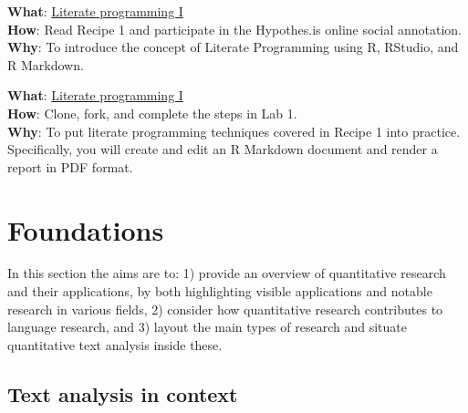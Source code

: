 \documentclass[
  letterpaper,
]{latex/krantz}
\begin{document}
\begin{tcolorbox}[enhanced jigsaw, opacitybacktitle=0.6, breakable, colframe=quarto-callout-note-color-frame, arc=.35mm, left=2mm, leftrule=.75mm, title=\textcolor{quarto-callout-note-color}{\faInfo}\hspace{0.5em}{Recipe}, opacityback=0, colback=white, toptitle=1mm, rightrule=.15mm, titlerule=0mm, bottomtitle=1mm, bottomrule=.15mm, coltitle=black, colbacktitle=quarto-callout-note-color!10!white, toprule=.15mm]
\textbf{What}:
\href{https://lin380.github.io/tadr/articles/recipe_1.html}{Literate
programming I}\\
\textbf{How}: Read Recipe 1 and participate in the Hypothes.is online
social annotation.\\
\textbf{Why}: To introduce the concept of Literate Programming using R,
RStudio, and R Markdown.
\end{tcolorbox}

\begin{tcolorbox}[enhanced jigsaw, opacitybacktitle=0.6, breakable, colframe=quarto-callout-note-color-frame, arc=.35mm, left=2mm, leftrule=.75mm, title=\textcolor{quarto-callout-note-color}{\faInfo}\hspace{0.5em}{Lab}, opacityback=0, colback=white, toptitle=1mm, rightrule=.15mm, titlerule=0mm, bottomtitle=1mm, bottomrule=.15mm, coltitle=black, colbacktitle=quarto-callout-note-color!10!white, toprule=.15mm]
\textbf{What}: \href{https://github.com/lin380/lab_1}{Literate
programming I}\\
\textbf{How}: Clone, fork, and complete the steps in Lab 1.\\
\textbf{Why}: To put literate programming techniques covered in Recipe 1
into practice. Specifically, you will create and edit an R Markdown
document and render a report in PDF format.
\end{tcolorbox}

\part{Foundations}

In this section the aims are to: 1) provide an overview of quantitative
research and their applications, by both highlighting visible
applications and notable research in various fields, 2) consider how
quantitative research contributes to language research, and 3) layout
the main types of research and situate quantitative text analysis inside
these.

\hypertarget{sec-text-analysis-in-context}{%
\chapter{Text analysis in context}\label{sec-text-analysis-in-context}}
\end{document}
